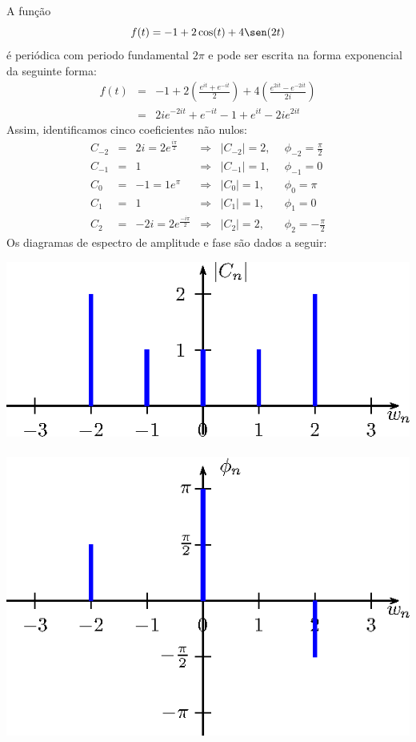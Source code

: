 \begin{ex} A função 
\begin{equation}f(t)=-1+2\cos(t)+4\sen(2t)\end{equation}
é periódica com periodo fundamental $2\pi$ e pode ser escrita na forma exponencial da seguinte forma:
\begin{eqnarray*}
f(t)&=&-1+2\left(\frac{e^{it}+e^{-it}}{2}\right)+4\left(\frac{e^{2it}-e^{-2it}}{2i}\right)\\
&=&2i e^{-2it} + e^{-it}-1+e^{it}- 2ie^{2it}
\end{eqnarray*}
Assim, identificamos cinco coeficientes não nulos:
\begin{equation*}
\begin{array}{lclcll}
 C_{-2}&=&2i=2e^{\frac{i\pi}{2}} &\Longrightarrow& |C_{-2}|=2, ~~ &\phi_{-2}=\frac{\pi}{2}\\
 C_{-1}&=&1 &\Longrightarrow& |C_{-1}|=1, ~~ &\phi_{-1}=0\\
 C_{0}&=&-1=1e^{\pi} &\Longrightarrow& |C_{0}|=1, ~~ &\phi_0=\pi\\
 C_{1}&=&1 &\Longrightarrow& |C_{1}|=1, ~~ &\phi_1=0\\
 C_{2}&=&-2i=2e^{\frac{-i\pi}{2}} &\Longrightarrow& |C_{2}|=2, ~~ &\phi_2=-\frac{\pi}{2}
\end{array}
 \end{equation*}
Os diagramas de espectro de amplitude e fase são dados a seguir:

\includegraphics{cap_diagramas_espectro/pics/figura_2}~\includegraphics{cap_diagramas_espectro/pics/figura_3}

\end{ex}
